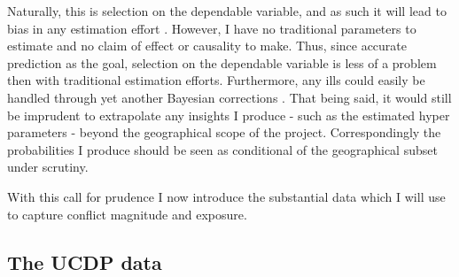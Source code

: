 \documentclass[a4paper]{article}
\begin{document}
Naturally, this is selection on the dependable variable, and as such it will lead to bias in any estimation effort \citep[129-130]{king1994designing}. However, I have no traditional parameters to estimate and no claim of effect or causality to make. Thus, since accurate prediction as the goal, selection on the dependable variable is less of a problem then with traditional estimation efforts. Furthermore, any ills could easily be handled through yet another Bayesian corrections \citep[627-628]{King_Zeng_2001}. That being said, it would still be imprudent to extrapolate any insights I produce - such as the estimated hyper parameters - beyond the geographical scope of the project. Correspondingly the probabilities I produce should be seen as conditional of the geographical subset under scrutiny.\par



With this call for prudence I now introduce the substantial data which I will use to capture conflict magnitude and exposure.\par

\subsection{The UCDP data}



\end{document}
